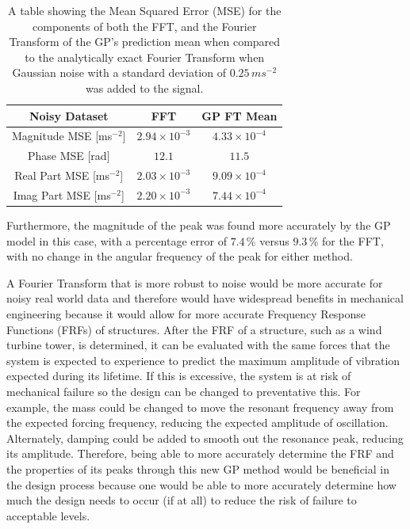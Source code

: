 \documentclass[12pt]{article}
\begin{document}
    \begin{table}[h]
        \centering %
        \setlength{\arrayrulewidth}{1pt} %
        \begin{tabular}{|c|c|c|} %
            \hline
            Noisy Dataset & FFT & GP FT Mean \\ %
            \hline
            Magnitude MSE [ms$^{-2}$] & $2.94 \times 10^{-3}$ & $4.33 \times 10^{-4}$ \\ %
            \hline
            Phase MSE [rad] & $12.1$ & $11.5$ \\ %
            \hline
            Real Part MSE [ms$^{-2}$] & $2.03 \times 10^{-3}$ & $9.09 \times 10^{-4}$ \\ %
            \hline
            Imag Part MSE [ms$^{-2}$] & $2.20 \times 10^{-3}$ & $7.44 \times 10^{-4}$ \\ %
            \hline
        \end{tabular}
        \caption{A table showing the Mean Squared Error (MSE) for the components of both the FFT, and the Fourier Transform of the GP's prediction mean when compared to the analytically exact Fourier Transform when Gaussian noise with a standard deviation of $0.25 \, ms^{-2}$ was added to the signal.}
        \label{tab:response-noise}
    \end{table}

    Furthermore, the magnitude of the peak was found more accurately by the GP model in this case, with a percentage error of $7.4 \, \%$ versus $9.3 \, \%$ for the FFT, with no change in the angular frequency of the peak for either method.

    A Fourier Transform that is more robust to noise would be more accurate for noisy real world data and therefore would have widespread benefits in mechanical engineering because it would allow for more accurate Frequency Response Functions (FRFs) of structures.
    After the FRF of a structure, such as a wind turbine tower, is determined, it can be evaluated with the same forces that the system is expected to experience to predict the maximum amplitude of vibration expected during its lifetime.
    If this is excessive, the system is at risk of mechanical failure so the design can be changed to preventative this.
    For example, the mass could be changed to move the resonant frequency away from the expected forcing frequency, reducing the expected amplitude of oscillation.
    Alternately, damping could be added to smooth out the resonance peak, reducing its amplitude.
    Therefore, being able to more accurately determine the FRF and the properties of its peaks through this new GP method would be beneficial in the design process because one would be able to more accurately determine how much the design needs to occur (if at all) to reduce the risk of failure to acceptable levels.
\end{document}
